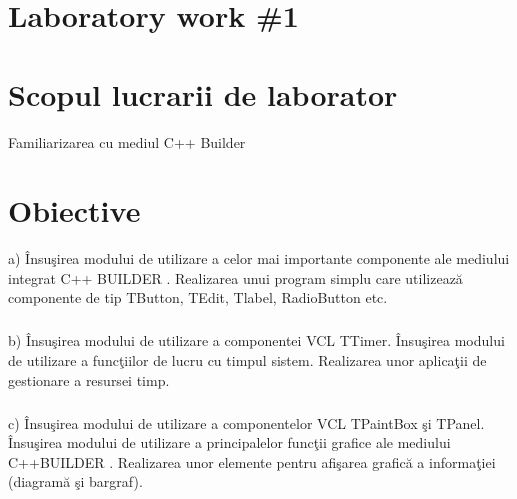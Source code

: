 \section*{Laboratory work \#1}

\section{Scopul lucrarii de laborator}
Familiarizarea cu mediul C++ Builder
\section{Obiective}

a) Însuşirea modului de utilizare a celor mai importante componente ale mediului integrat C++ BUILDER . Realizarea unui program simplu care utilizează componente de tip TButton, TEdit, Tlabel, RadioButton  etc.  
\subparagraph{}b) Însuşirea modului de utilizare a componentei VCL TTimer. Însuşirea modului de utilizare a funcţiilor de lucru cu timpul sistem. Realizarea unor aplicaţii de gestionare a resursei timp. 
\subparagraph{}c) Însuşirea modului de utilizare a componentelor VCL  TPaintBox şi TPanel. Însuşirea modului de utilizare a principalelor funcţii grafice ale mediului C++BUILDER . Realizarea unor elemente pentru  afişarea grafică a informaţiei (diagramă şi bargraf).  


\clearpage